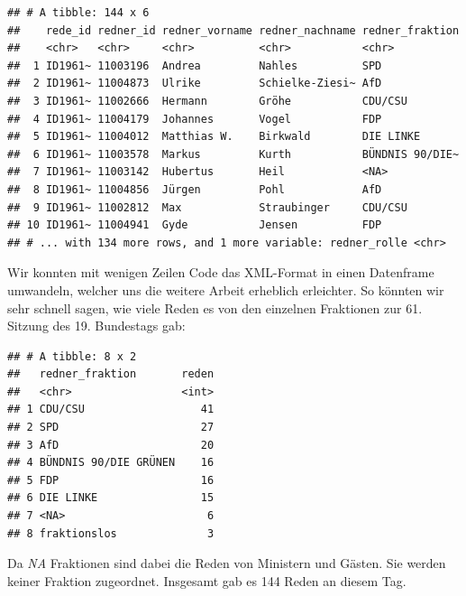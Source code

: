 \documentclass[oneside, 12pt, numbers=endperiod]{scrbook}
\newenvironment{Shaded}{\begin{snugshade}}{\end{snugshade}}
\newcommand{\DataTypeTok}[1]{\textcolor[rgb]{0.13,0.29,0.53}{#1}}
\newcommand{\KeywordTok}[1]{\textcolor[rgb]{0.13,0.29,0.53}{\textbf{#1}}}
\newcommand{\NormalTok}[1]{#1}
\newcommand{\OperatorTok}[1]{\textcolor[rgb]{0.81,0.36,0.00}{\textbf{#1}}}
\newcommand{\StringTok}[1]{\textcolor[rgb]{0.31,0.60,0.02}{#1}}
\theoremstyle{definition}
\theoremstyle{definition}
\theoremstyle{definition}
\theoremstyle{remark}
\begin{document}
\begin{verbatim}
## # A tibble: 144 x 6
##    rede_id redner_id redner_vorname redner_nachname redner_fraktion
##    <chr>   <chr>     <chr>          <chr>           <chr>          
##  1 ID1961~ 11003196  Andrea         Nahles          SPD            
##  2 ID1961~ 11004873  Ulrike         Schielke-Ziesi~ AfD            
##  3 ID1961~ 11002666  Hermann        Gröhe           CDU/CSU        
##  4 ID1961~ 11004179  Johannes       Vogel           FDP            
##  5 ID1961~ 11004012  Matthias W.    Birkwald        DIE LINKE      
##  6 ID1961~ 11003578  Markus         Kurth           BÜNDNIS 90/DIE~
##  7 ID1961~ 11003142  Hubertus       Heil            <NA>           
##  8 ID1961~ 11004856  Jürgen         Pohl            AfD            
##  9 ID1961~ 11002812  Max            Straubinger     CDU/CSU        
## 10 ID1961~ 11004941  Gyde           Jensen          FDP            
## # ... with 134 more rows, and 1 more variable: redner_rolle <chr>
\end{verbatim}

Wir konnten mit wenigen Zeilen Code das XML-Format in einen Datenframe
umwandeln, welcher uns die weitere Arbeit erheblich erleichter. So
könnten wir sehr schnell sagen, wie viele Reden es von den einzelnen
Fraktionen zur 61. Sitzung des 19. Bundestags gab:

\begin{Shaded}
\end{Shaded}

\begin{verbatim}
## # A tibble: 8 x 2
##   redner_fraktion       reden
##   <chr>                 <int>
## 1 CDU/CSU                  41
## 2 SPD                      27
## 3 AfD                      20
## 4 BÜNDNIS 90/DIE GRÜNEN    16
## 5 FDP                      16
## 6 DIE LINKE                15
## 7 <NA>                      6
## 8 fraktionslos              3
\end{verbatim}

Da \emph{NA} Fraktionen sind dabei die Reden von Ministern und Gästen.
Sie werden keiner Fraktion zugeordnet. Insgesamt gab es 144 Reden an
diesem Tag.
\end{document}

